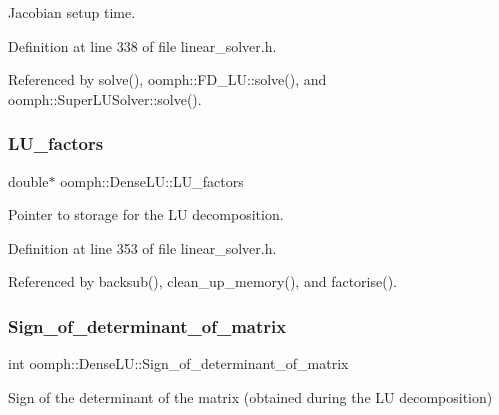 Jacobian setup time. 



Definition at line 338 of file linear\+\_\+solver.\+h.



Referenced by solve(), oomph\+::\+F\+D\+\_\+\+L\+U\+::solve(), and oomph\+::\+Super\+L\+U\+Solver\+::solve().

\mbox{\label{classoomph_1_1DenseLU_a9b393b33667887cfdafa6290c7b3e209}} 
\subsubsection{\texorpdfstring{L\+U\+\_\+factors}{LU\_factors}}
{\footnotesize\ttfamily double$\ast$ oomph\+::\+Dense\+L\+U\+::\+L\+U\+\_\+factors\hspace{0.3cm}{\ttfamily [private]}}



Pointer to storage for the LU decomposition. 



Definition at line 353 of file linear\+\_\+solver.\+h.



Referenced by backsub(), clean\+\_\+up\+\_\+memory(), and factorise().

\mbox{\label{classoomph_1_1DenseLU_aea4118f8ead9e3f89f8d234f572766d1}} 
\subsubsection{\texorpdfstring{Sign\+\_\+of\+\_\+determinant\+\_\+of\+\_\+matrix}{Sign\_of\_determinant\_of\_matrix}}
{\footnotesize\ttfamily int oomph\+::\+Dense\+L\+U\+::\+Sign\+\_\+of\+\_\+determinant\+\_\+of\+\_\+matrix\hspace{0.3cm}{\ttfamily [protected]}}



Sign of the determinant of the matrix (obtained during the LU decomposition) 



